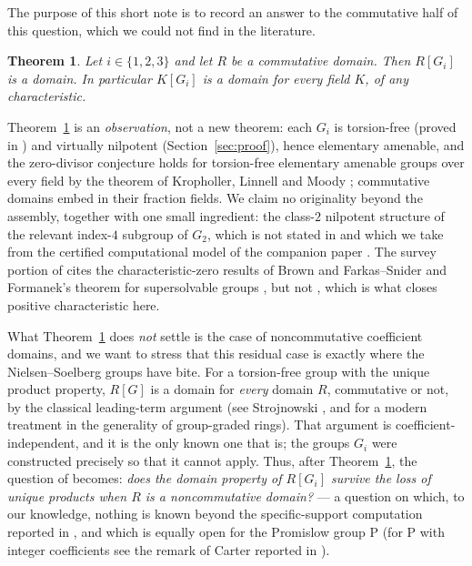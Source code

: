 \documentclass[10pt,a4paper]{amsart}
\newtheorem{theorem}{Theorem}[section]
\newcommand{\GTwo}{G_2}
\renewcommand{\P}{\mathrm{P}}
\begin{document}
The purpose of this short note is to record an answer to the commutative
half of this question, which we could not find in the literature.


\begin{theorem}\label{thm:main}
Let $i\in\{1,2,3\}$ and let $R$ be a commutative domain. Then $R[G_i]$ is a
domain. In particular $K[G_i]$ is a domain for every field $K$, of any
characteristic.
\end{theorem}


Theorem~\ref{thm:main} is an \emph{observation}, not a new theorem: each
$G_i$ is torsion-free (proved in \cite{NS}) and virtually nilpotent
(Section~\ref{sec:proof}), hence elementary amenable, and the zero-divisor
conjecture holds for torsion-free elementary amenable groups over every
field by the theorem of Kropholler, Linnell and Moody \cite[Theorem
1.4]{KLM}; commutative domains embed in their fraction fields. We claim no
originality beyond the assembly, together with one small ingredient: the
class-$2$ nilpotent structure of the relevant index-$4$ subgroup of
$\GTwo$, which is not stated in \cite{NS} and which we take from the
certified computational model of the companion paper \cite{companion}. The
survey portion of \cite{NS} cites the characteristic-zero results of Brown
\cite{Brown} and Farkas--Snider \cite{FS} and Formanek's theorem for
supersolvable groups \cite{Formanek}, but not \cite{KLM}, which is what
closes positive characteristic here.

What Theorem~\ref{thm:main} does \emph{not} settle is the case of
noncommutative coefficient domains, and we want to stress that this
residual case is exactly where the Nielsen--Soelberg groups have bite. For
a torsion-free group with the unique product property, $R[G]$ is a domain
for \emph{every} domain $R$, commutative or not, by the classical
leading-term argument (see Strojnowski \cite{Strojnowski}, and
\cite{Oinert} for a modern treatment in the generality of group-graded
rings). That argument is coefficient-independent, and it is the only known
one that is; the groups $G_i$ were constructed precisely so that it cannot
apply. Thus, after Theorem~\ref{thm:main}, the question of \cite{NS}
becomes: \emph{does the domain property of $R[G_i]$ survive the loss of
unique products when $R$ is a noncommutative domain?} --- a question on
which, to our knowledge, nothing is known beyond the specific-support
computation reported in \cite{NS,Soelberg}, and which is equally open for
the Promislow group $\P$ (for $\P$ with integer coefficients see the remark
of Carter \cite{Carter} reported in \cite{NS}).
\end{document}
